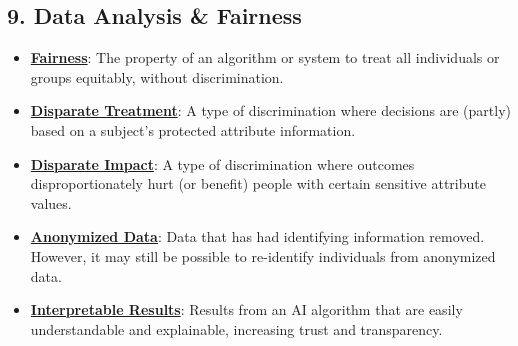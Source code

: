 \documentclass{article}%
\begin{document}
\subsection{9.  Data Analysis \& Fairness}%
\label{subsec:9.DataAnalysisFairness}%
\begin{itemize}[leftmargin=*]%
\item \href{https://purdue.brightspace.com/d2l/common/assets/pdfjs-d2l-dist/1.0.14-legacy/web/viewer.html?file=\%2Fcontent\%2Fenforced\%2F1095467-wl.202510.CS.24300.001\%2F16L2-ethics.pdf\%3Fou\%3D1095467\&lang=en-us\&container=d2l-fileviewer-rendered-pdf\&fullscreen=d2l-fileviewer-rendered-pdf-dialog\&height=667#page=2}{\textbf{Fairness}}: The property of an algorithm or system to treat all individuals or groups equitably, without discrimination.%
\item \href{https://purdue.brightspace.com/d2l/common/assets/pdfjs-d2l-dist/1.0.14-legacy/web/viewer.html?file=\%2Fcontent\%2Fenforced\%2F1095467-wl.202510.CS.24300.001\%2F16L2-ethics.pdf\%3Fou\%3D1095467\&lang=en-us\&container=d2l-fileviewer-rendered-pdf\&fullscreen=d2l-fileviewer-rendered-pdf-dialog\&height=667#page=19}{\textbf{Disparate Treatment}}: A type of discrimination where decisions are (partly) based on a subject's protected attribute information.%
\item \href{https://purdue.brightspace.com/d2l/common/assets/pdfjs-d2l-dist/1.0.14-legacy/web/viewer.html?file=\%2Fcontent\%2Fenforced\%2F1095467-wl.202510.CS.24300.001\%2F16L2-ethics.pdf\%3Fou\%3D1095467\&lang=en-us\&container=d2l-fileviewer-rendered-pdf\&fullscreen=d2l-fileviewer-rendered-pdf-dialog\&height=667#page=19}{\textbf{Disparate Impact}}: A type of discrimination where outcomes disproportionately hurt (or benefit) people with certain sensitive attribute values.%
\item \href{https://purdue.brightspace.com/d2l/common/assets/pdfjs-d2l-dist/1.0.14-legacy/web/viewer.html?file=\%2Fcontent\%2Fenforced\%2F1095467-wl.202510.CS.24300.001\%2F16L2-ethics.pdf\%3Fou\%3D1095467\&lang=en-us\&container=d2l-fileviewer-rendered-pdf\&fullscreen=d2l-fileviewer-rendered-pdf-dialog\&height=667#page=10}{\textbf{Anonymized Data}}: Data that has had identifying information removed. However, it may still be possible to re-identify individuals from anonymized data.%
\item \href{https://purdue.brightspace.com/d2l/common/assets/pdfjs-d2l-dist/1.0.14-legacy/web/viewer.html?file=\%2Fcontent\%2Fenforced\%2F1095467-wl.202510.CS.24300.001\%2F16L2-ethics.pdf\%3Fou\%3D1095467\&lang=en-us\&container=d2l-fileviewer-rendered-pdf\&fullscreen=d2l-fileviewer-rendered-pdf-dialog\&height=667#page=28}{\textbf{Interpretable Results}}: Results from an AI algorithm that are easily understandable and explainable, increasing trust and transparency.%

\end{itemize}
\end{document}
